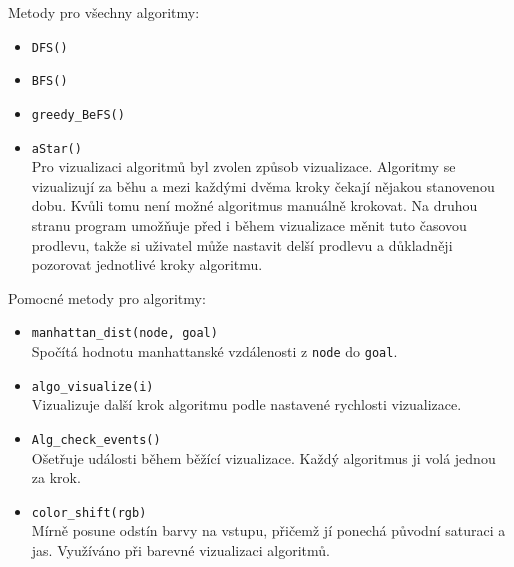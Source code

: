 \documentclass[12pt]{report}			%
\begin{document}
Metody pro všechny algoritmy:
\begin{itemize}
			\setlength\itemsep{0.01mm}
\item \texttt{DFS()}
\item \texttt{BFS()}
\item \texttt{greedy\_BeFS()}
\item \texttt{aStar()}\\
Pro vizualizaci algoritmů byl zvolen  způsob vizualizace. Algoritmy se vizualizují za běhu a mezi každými dvěma kroky čekají nějakou stanovenou dobu. Kvůli tomu není možné algoritmus manuálně krokovat. Na druhou stranu program umožňuje před i během vizualizace měnit tuto časovou prodlevu, takže si uživatel může nastavit delší prodlevu a důkladněji pozorovat jednotlivé kroky algoritmu. 
\end{itemize}

Pomocné metody pro algoritmy:
\begin{itemize}
\setlength\itemsep{0.01mm}
\item \texttt{manhattan\_dist(node, goal)}\\
Spočítá hodnotu manhattanské vzdálenosti z \texttt{node} do \texttt{goal}.
\item \texttt{algo\_visualize(i)}\\
Vizualizuje další krok algoritmu podle nastavené rychlosti vizualizace.






\item \texttt{Alg\_check\_events()}\\
Ošetřuje události během  běžící vizualizace. Každý algoritmus ji volá jednou za krok. 
\item \texttt{color\_shift(rgb)}\\
Mírně posune odstín barvy na vstupu, přičemž jí ponechá původní saturaci a jas. Využíváno při barevné vizualizaci algoritmů.
\end{itemize}
\end{document}
